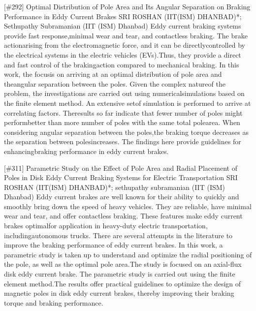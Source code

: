 {} \begin{abstract_online} {[\#292] Optimal Distribution of Pole Area and Its Angular Separation on Braking Performance in Eddy Current Brakes} {} {SRI ROSHAN (IIT(ISM) DHANBAD)*; Sethupathy Subramanian (IIT (ISM) Dhanbad)} {} Eddy current braking systems provide fast response,minimal wear and tear, and contactless braking. The brake actionarising from the electromagnetic force, and it can be directlycontrolled by the electrical systems in the electric vehicles (EVs).Thus, they provide a direct and fast control of the brakingaction compared to mechanical braking. In this work, the focusis on arriving at an optimal distribution of pole area and theangular separation between the poles. Given the complex natureof the problem, the investigations are carried out using numericalsimulations based on the finite element method. An extensive setof simulation is performed to arrive at correlating factors. Theresults so far indicate that fewer number of poles might performbetter than more number of poles with the same total polearea. When considering angular separation between the poles,the braking torque decreases as the separation between polesincreases. The findings here provide guidelines for enhancingbraking performance in eddy current brakes. \end{abstract_online} 
{} \begin{abstract_online} {[\#311] Parametric Study on the Effect of Pole Area and Radial Placement of Poles in Disk Eddy Current Braking Systems for Electric Transportation} {} {SRI ROSHAN (IIT(ISM) DHANBAD)*; sethupathy subramanian (IIT (ISM) Dhanbad)} {} Eddy current brakes are well known for their ability to quickly and smoothly bring down the speed of heavy vehicles. They are reliable, have minimal wear and tear, and offer contactless braking. These features make eddy current brakes optimalfor application in heavy-duty electric transportation, includingautonomous trucks. There are several attempts in the literature to improve the braking performance of eddy current brakes. In this work, a parametric study is taken up to understand and optimize the radial positioning of the pole, as well as the optimal pole area.The study is focused on an axial-flux disk eddy current brake. The parametric study is carried out using the finite element method.The results offer practical guidelines to optimize the design of magnetic poles in disk eddy current brakes, thereby improving their braking torque and braking performance. \end{abstract_online} 
